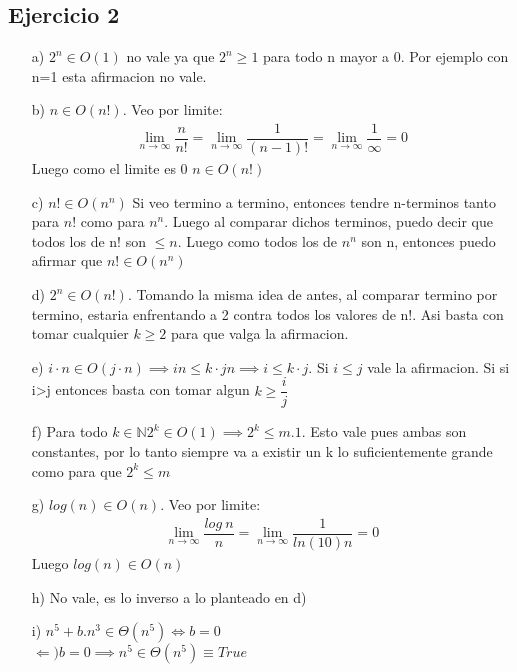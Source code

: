 \documentclass{article}
\begin{document}
\subsection*{Ejercicio 2}
\begin{itemize}
    \item [a) ] $2^n\in O(1)$ no vale ya que $2^n\geq 1$ para todo n mayor a 0. Por
    ejemplo con n=1 esta afirmacion no vale.
    \item [b) ] $n\in O(n!)$. Veo por limite:
    \setcounter{equation}{0}
    \begin{align}
        \lim_{n\to\infty}\dfrac{n}{n!}=\lim_{n\to\infty}\dfrac{1}{(n-1)!}=\lim_{n\to\infty}\dfrac{1}{\infty}=0
    \end{align}
    Luego como el limite es 0 $n\in O(n!)$

    \item [c) ] $n!\in O(n^n)$ Si veo termino a termino, entonces tendre n-terminos tanto
    para $n!$ como para $n^n$. Luego al comparar dichos terminos, puedo decir que todos los de n!
    son $\leq n$. Luego como todos los de $n^n$ son n, entonces puedo afirmar que $n!\in O(n^n)$

    \item [d) ] $2^n\in O(n!)$. Tomando la misma idea de antes, al comparar termino por termino,
    estaria enfrentando a 2 contra todos los valores de n!. Asi basta con tomar cualquier
    $k\geq 2$ para que valga la afirmacion.

    \item [e) ] $i\cdot n\in O(j\cdot n)\implies in\leq k\cdot jn \implies i\leq k\cdot j$. Si $i\leq j$ vale
    la afirmacion. Si si i>j entonces basta con tomar algun $k\geq\dfrac{i}{j}$

    \item [f) ] Para todo $k\in\mathbb{N} 2^k\in O(1)\implies 2^k\leq m.1$. Esto vale
    pues ambas son constantes, por lo tanto siempre va a existir un k lo suficientemente grande
    como para que $2^k\leq m$

    \item[g) ] $log(n)\in O(n)$. Veo por limite:
    \setcounter{equation}{0}
    \begin{align}
        \lim_{n\to\infty}\dfrac{log\ n}{n}=\lim_{n\to\infty}\dfrac{1}{ln(10)n}=0
    \end{align}
    Luego $log(n)\in O(n)$

    \item [h) ] No vale, es lo inverso a lo planteado en d)

    \item [i) ] $n^5+b.n^3 \in \Theta(n^5) \Leftrightarrow b=0$\\
    $\Leftarrow ) b=0 \implies n^5\in\Theta(n^5) \equiv True$


\end{itemize}
\end{document}
